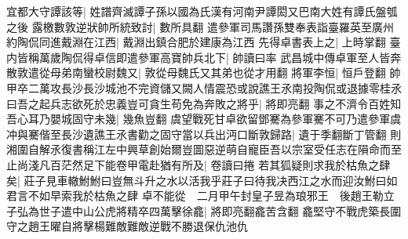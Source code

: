 宜都大守譚該等|{
	姓譜齊滅譚子孫以國為氏漢有河南尹譚閎又巴南大姓有譚氏盤瓠之後}
露檄數敦逆狀帥所統致討|{
	數所具翻}
遣參軍司馬讚孫雙奉表詣臺羅英至廣州約陶侃同進戴淵在江西|{
	戴淵出鎮合肥於建康為江西}
先得卓書表上之|{
	上時掌翻}
臺内皆稱萬歲陶侃得卓信即遣參軍高寶帥兵北下|{
	帥讀曰率}
武昌城中傳卓軍至人皆奔散敦遣從母弟南蠻校尉魏又|{
	敦從母魏氏又其弟也從才用翻}
將軍李恒|{
	恒戶登翻}
帥甲卒二萬攻長沙長沙城池不完資儲又闕人情震恐或說譙王氶南投陶侃或退據零桂氶曰吾之起兵志欲死於忠義豈可貪生苟免為奔敗之將乎|{
	將即亮翻}
事之不濟令百姓知吾心耳乃嬰城固守未幾|{
	幾魚豈翻}
虞望戰死甘卓欲留鄧騫為參軍騫不可乃遣參軍虞冲與騫偕至長沙遺譙王氶書勸之固守當以兵出沔口斷敦歸路|{
	遺于季翻斷丁管翻}
則湘圍自解氶復書稱江左中興草創始爾豈圖惡逆萌自寵臣吾以宗室受任志在隕命而至止尚淺凡百茫然足下能卷甲電赴猶有所及|{
	卷讀曰捲}
若其狐疑則求我於枯魚之肆矣|{
	莊子見車轍鮒鮒曰豈無斗升之水以活我乎莊子曰待我决西江之水而迎汝鮒曰如君言不如早索我於枯魚之肆}
卓不能從　二月甲午封皇子昱為琅邪王　後趙王勒立子弘為世子遣中山公虎將精卒四萬擊徐龕|{
	將即亮翻龕苦含翻}
龕堅守不戰虎築長圍守之趙王曜自將擊楊難敵難敵逆戰不勝退保仇池仇

